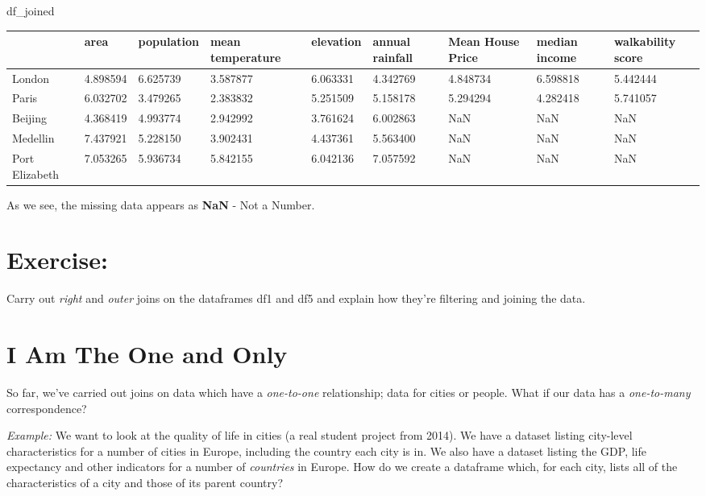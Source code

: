 \documentclass[
  letterpaper,
  DIV=11,
  numbers=noendperiod]{scrreprt}
\newenvironment{Shaded}{\begin{snugshade}}{\end{snugshade}}
\newcommand{\NormalTok}[1]{\textcolor[rgb]{0.00,0.23,0.31}{#1}}
\begin{document}
\begin{Shaded}
\begin{Highlighting}[]
\NormalTok{df\_joined}
\end{Highlighting}
\end{Shaded}

\begin{longtable}[]{@{}lllllllll@{}}
\toprule\noalign{}
& area & population & mean temperature & elevation & annual rainfall &
Mean House Price & median income & walkability score \\
\midrule\noalign{}
\endhead
\bottomrule\noalign{}
\endlastfoot
London & 4.898594 & 6.625739 & 3.587877 & 6.063331 & 4.342769 & 4.848734
& 6.598818 & 5.442444 \\
Paris & 6.032702 & 3.479265 & 2.383832 & 5.251509 & 5.158178 & 5.294294
& 4.282418 & 5.741057 \\
Beijing & 4.368419 & 4.993774 & 2.942992 & 3.761624 & 6.002863 & NaN &
NaN & NaN \\
Medellin & 7.437921 & 5.228150 & 3.902431 & 4.437361 & 5.563400 & NaN &
NaN & NaN \\
Port Elizabeth & 7.053265 & 5.936734 & 5.842155 & 6.042136 & 7.057592 &
NaN & NaN & NaN \\
\end{longtable}

As we see, the missing data appears as \textbf{NaN} - Not a Number.

\hypertarget{exercise-14}{%
\section{Exercise:}\label{exercise-14}}

Carry out \emph{right} and \emph{outer} joins on the dataframes df1 and
df5 and explain how they're filtering and joining the data.

\hypertarget{i-am-the-one-and-only}{%
\section{I Am The One and Only}\label{i-am-the-one-and-only}}

So far, we've carried out joins on data which have a \emph{one-to-one}
relationship; data for cities or people. What if our data has a
\emph{one-to-many} correspondence?

\emph{Example:} We want to look at the quality of life in cities (a real
student project from 2014). We have a dataset listing city-level
characteristics for a number of cities in Europe, including the country
each city is in. We also have a dataset listing the GDP, life expectancy
and other indicators for a number of \emph{countries} in Europe. How do
we create a dataframe which, for each city, lists all of the
characteristics of a city and those of its parent country?
\end{document}
